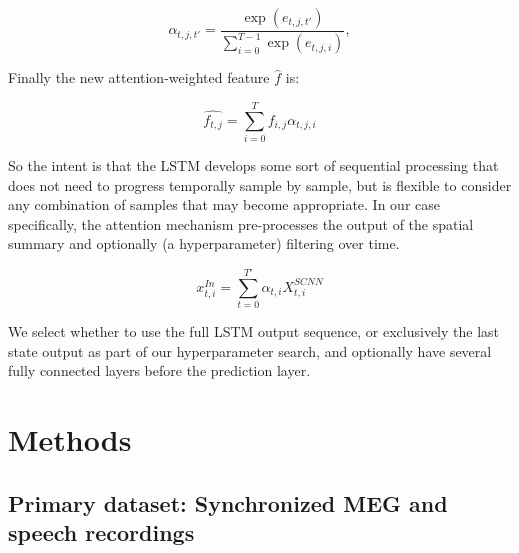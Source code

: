 \documentclass[fleqn,10pt]{wlscirep}
\begin{document}
\begin{equation} \label{eq:attn_nrg}
  \alpha_{t,j,t'} =  \frac{\exp(e_{t,j,t'})}{\sum_{i=0}^{T-1}\exp(e_{t,j,i})},
\end{equation}

Finally the new attention-weighted feature $\hat{f}$ is: 

\begin{equation} \label{eq:attn}
    \hat{f_{t,j}} = \sum_{i=0}^{T} f_{i,j} \alpha_{t,j,i}
\end{equation}

So the intent is that the LSTM develops some sort of sequential processing that does not need to progress temporally sample by sample, but is flexible to consider any combination of samples that may become appropriate. In our case specifically, the attention mechanism pre-processes the output of the spatial summary and optionally (a hyperparameter) filtering over time.

\begin{equation}
  x_{t,i}^{In} = \sum_{t=0}^{T'} \alpha_{t,i} X_{t,i}^{SCNN}
\end{equation}

We select whether to use the full LSTM output sequence, or exclusively the last state output as part of our hyperparameter search, and optionally have several fully connected layers before the prediction layer.

\section*{Methods}

\subsection*{Primary dataset: Synchronized MEG and speech recordings}
\end{document}
